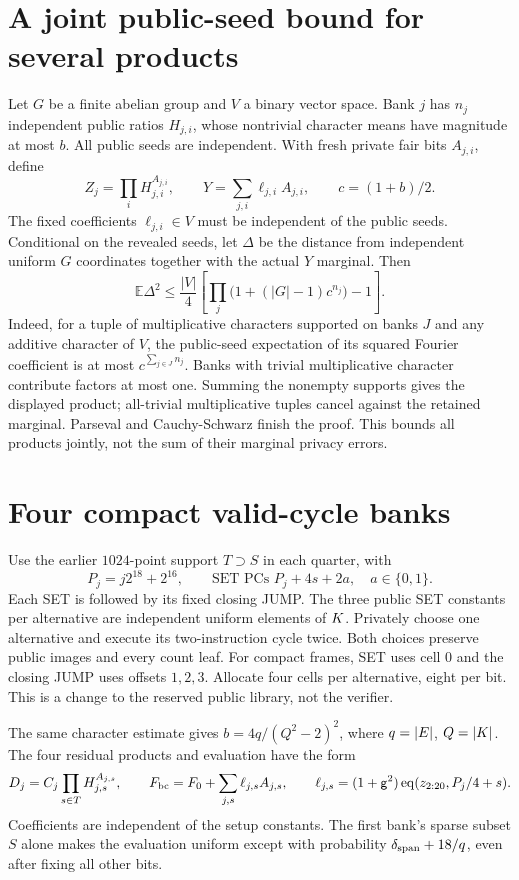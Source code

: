 \documentclass[11pt]{article}
\begin{document}
\section{A joint public-seed bound for several products}

Let $G$ be a finite abelian group and $V$ a binary vector space. Bank $j$ has $n_j$ independent public ratios $H_{j,i}$, whose nontrivial character means have magnitude at most $b$. All public seeds are independent. With fresh private fair bits $A_{j,i}$, define
\[
 Z_j=\prod_iH_{j,i}^{A_{j,i}},\qquad
 Y=\sum_{j,i}\ell_{j,i}A_{j,i},\qquad c=(1+b)/2.
\]
The fixed coefficients $\ell_{j,i}\in V$ must be independent of the public seeds. Conditional on the revealed seeds, let $\Delta$ be the distance from independent uniform $G$ coordinates together with the actual $Y$ marginal. Then
\[
 \mathbb E\Delta^2\le
 \frac{|V|}{4}\left[\prod_j\bigl(1+(|G|-1)c^{n_j}\bigr)-1\right].
\]
Indeed, for a tuple of multiplicative characters supported on banks $J$ and any additive character of $V$, the public-seed expectation of its squared Fourier coefficient is at most $c^{\sum_{j\in J}n_j}$. Banks with trivial multiplicative character contribute factors at most one. Summing the nonempty supports gives the displayed product; all-trivial multiplicative tuples cancel against the retained marginal. Parseval and Cauchy-Schwarz finish the proof. This bounds all products jointly, not the sum of their marginal privacy errors.

\section{Four compact valid-cycle banks}

Use the earlier $1024$-point support $T\supset S$ in each quarter, with
\[
 P_j=j2^{18}+2^{16},\qquad
 \text{SET PCs }P_j+4s+2a,\quad a\in\{0,1\}.
\]
Each SET is followed by its fixed closing JUMP. The three public SET constants per alternative are independent uniform elements of $K$. Privately choose one alternative and execute its two-instruction cycle twice. Both choices preserve public images and every count leaf. For compact frames, SET uses cell $0$ and the closing JUMP uses offsets $1,2,3$. Allocate four cells per alternative, eight per bit. This is a change to the reserved public library, not the verifier.

The same character estimate gives $b=4q/(Q^2-2)^2$, where $q=|E|$, $Q=|K|$. The four residual products and evaluation have the form
\[
 D_j=C_j\prod_{s\in T}H_{j,s}^{A_{j,s}},\qquad
 F_{\rm bc}=F_0+\sum_{j,s}\ell_{j,s}A_{j,s},\qquad
 \ell_{j,s}=(1+\mathsf{g}^2)\operatorname{eq}(z_{2:20},P_j/4+s).
\]
Coefficients are independent of the setup constants. The first bank's sparse subset $S$ alone makes the evaluation uniform except with probability $\delta_{\rm span}+18/q$, even after fixing all other bits.
\end{document}
